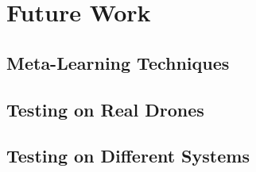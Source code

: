 \chapter{Future Work}
\section{Meta-Learning Techniques}
\section{Testing on Real Drones}
\section{Testing on Different Systems}